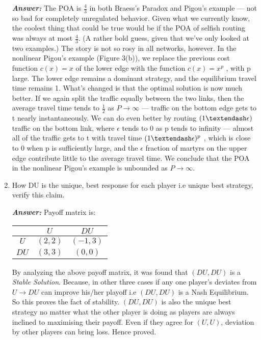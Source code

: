\documentclass[15pt]{article}
\begin{document}
\begin{enumerate}
\textbf{\emph{Answer: }} The POA is $\frac{4}{3}$ in both Braess’s Paradox and Pigou’s example — not so bad for completely unregulated behavior. Given what we currently know, the coolest thing that could be true would be if the POA of selfish routing was always at most $\frac{4}{3}$. (A rather bold guess, given that we've only looked at two examples.) The story is not so rosy in all networks, however. In the nonlinear Pigou’s example (Figure 3(b)), we replace the previous cost function $c(x) = x$ of the lower edge with the function $c(x) = x^p$ , with p large. The lower edge remains a
dominant strategy, and the equilibrium travel time remains 1. What’s changed is that the optimal solution is now much better. If we again split the traffic equally between the two links, then the average travel time tends to $\frac{1}{2}$ as $P \to \infty$ — traffic on the bottom edge gets to t nearly instantaneously. We can do even better by routing $(1\textendash\epsilon)$ traffic on the bottom
link, where $\epsilon$ tends to 0 as p tends to infinity — almost all of the traffic gets to t with travel
time $(1\textendash\epsilon)^p$ , which is close to 0 when p is sufficiently large, and the $\epsilon$ fraction of martyrs
on the upper edge contribute little to the average travel time. We conclude that the POA in the nonlinear Pigou’s example is unbounded as $P \to \infty$.

\item 
How DU is the unique, best response for each player i.e unique best strategy, verify this claim.

\textbf{\emph{Answer: }}
Payoff matrix is:

\begin{center}
\begin{tabular}{ |c|c|c| }
 \hline
 & $U$ & $DU$  \\ [0.5ex] 
 \hline
 $U$ & $(2,2)$ & $(-1,3)$ \\ 
 \hline
 $DU$ & $(3,3)$ & $(0,0)$\\ [1ex] 
 \hline
\end{tabular}
\end{center}

By analyzing the above payoff matrix, it was found that $(DU, DU )$ is a \emph{Stable Solution}. Because, in other three cases if any one player's deviates from $U \to DU$ can improve his/her playoff i.e $(DU, DU )$ is a Nash Equilibrium. So this proves the fact of stability. $(DU, DU )$ is also the unique best strategy no matter what the other player is doing as players are always inclined to maximising their payoff. Even if they agree for $(U, U )$, deviation by other players can bring loss. Hence proved.


\end{enumerate}
\end{document}
